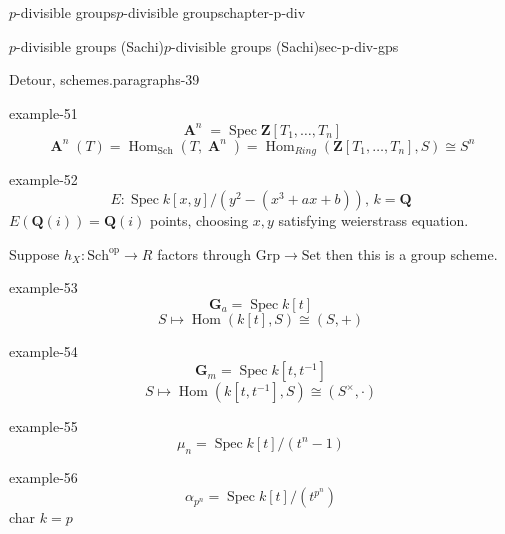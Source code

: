 \documentclass[oneside,10pt,]{book}
\numberwithin{equation}{section}
\newcommand{\inv}{^{-1}}
\newcommand{\lb}{[}
\newcommand{\rb}{]}
\newcommand{\ZZ}{\mathbf{Z}}
\newcommand{\QQ}{\mathbf{Q}}
\newcommand{\op}{\mathrm{op}}
\DeclareMathOperator{\Hom}{Hom}
\DeclareMathOperator{\Spec}{Spec}
\DeclareMathOperator{\aff}{\mathbf{A}}
\begin{document}
\begin{chapterptx}{\(p\)-divisible groups}{}{\(p\)-divisible groups}{}{}{chapter-p-div}
\begin{sectionptx}{\(p\)-divisible groups (Sachi)}{}{\(p\)-divisible groups (Sachi)}{}{}{sec-p-div-gps}
\begin{paragraphs}{Detour, schemes.}{paragraphs-39}
\begin{example}{}{example-51}%
\hypertarget{p-992}{}%
%
\begin{equation*}
\aff^n = \Spec \ZZ \lb T_1,\ldots, T_n\rb
\end{equation*}
%
\begin{equation*}
\aff^n(T) = \Hom_{\mathrm{Sch}} (T, \aff^n) = \Hom_{Ring}(\ZZ[T_1,\ldots, T_n], S)\cong S^n
\end{equation*}
%
\end{example}
\begin{example}{}{example-52}%
\hypertarget{p-993}{}%
%
\begin{equation*}
E \colon \Spec k[x,y] / (y^2 - (x^3 + ax +b)),\,k = \QQ
\end{equation*}
\(E(\QQ(i)) = \QQ(i)\) points, choosing \(x,y\) satisfying weierstrass equation.%
\end{example}
\hypertarget{p-994}{}%
Suppose \(h_X \colon \mathrm{Sch}^\op \to R\) factors through \(\mathrm{Grp} \to \mathrm{Set}\) then this is a group scheme.%
\begin{example}{}{example-53}%
\hypertarget{p-995}{}%
%
\begin{equation*}
\mathbf G_a = \Spec k[t]
\end{equation*}
%
\begin{equation*}
S\mapsto \Hom(k[t], S) \cong (S,+)
\end{equation*}
%
\end{example}
\begin{example}{}{example-54}%
\hypertarget{p-996}{}%
%
\begin{equation*}
\mathbf G_m = \Spec k[t,t\inv]
\end{equation*}
%
\begin{equation*}
S\mapsto \Hom(k[t,t\inv], S) \cong (S^\times,\cdot)
\end{equation*}
%
\end{example}
\begin{example}{}{example-55}%
\hypertarget{p-997}{}%
%
\begin{equation*}
\mu_n = \Spec k[t]/(t^n -1)
\end{equation*}
%
\end{example}
\begin{example}{}{example-56}%
\hypertarget{p-998}{}%
%
\begin{equation*}
\alpha_{p^n} = \Spec k[t]/(t^{p^n})
\end{equation*}
char \(k = p\)%
\end{example}
\hypertarget{p-999}{}%

\end{paragraphs}
\end{sectionptx}
\end{chapterptx}
\end{document}
